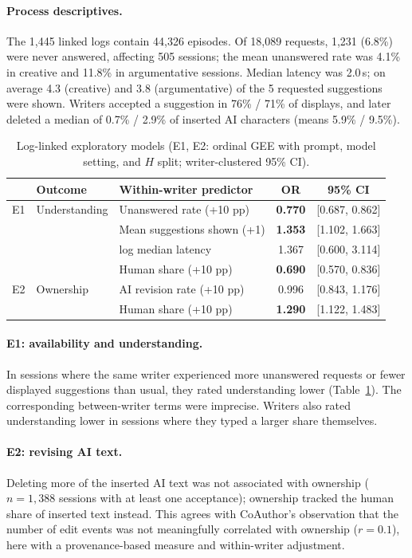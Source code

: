 \documentclass[10pt]{article}
\begin{document}
\paragraph{Process descriptives.} The 1,445 linked logs contain 44,326 episodes. Of 18,089 requests, 1,231 (6.8\%) were never answered, affecting 505 sessions; the mean unanswered rate was 4.1\% in creative and 11.8\% in argumentative sessions. Median latency was 2.0\,s; on average 4.3 (creative) and 3.8 (argumentative) of the 5 requested suggestions were shown. Writers accepted a suggestion in 76\% / 71\% of displays, and later deleted a median of 0.7\% / 2.9\% of inserted AI characters (means 5.9\% / 9.5\%).

\begin{table}[h]
\centering\small
\caption{Log-linked exploratory models (E1, E2: ordinal GEE with prompt, model setting, and $H$ split; writer-clustered 95\% CI).}\label{tab:logs}
\begin{tabular}{lllcc}
\toprule
& Outcome & Within-writer predictor & OR & 95\% CI \\
\midrule
E1 & Understanding & Unanswered rate (+10 pp) & \textbf{0.770} & [0.687, 0.862] \\
 & & Mean suggestions shown (+1) & \textbf{1.353} & [1.102, 1.663] \\
 & & log median latency & 1.367 & [0.600, 3.114] \\
 & & Human share (+10 pp) & \textbf{0.690} & [0.570, 0.836] \\
E2 & Ownership & AI revision rate (+10 pp) & 0.996 & [0.843, 1.176] \\
 & & Human share (+10 pp) & \textbf{1.290} & [1.122, 1.483] \\
\bottomrule
\end{tabular}
\end{table}

\paragraph{E1: availability and understanding.} In sessions where the same writer experienced more unanswered requests or fewer displayed suggestions than usual, they rated understanding lower (Table~\ref{tab:logs}). The corresponding between-writer terms were imprecise. Writers also rated understanding lower in sessions where they typed a larger share themselves.
\paragraph{E2: revising AI text.} Deleting more of the inserted AI text was not associated with ownership ($n=1{,}388$ sessions with at least one acceptance); ownership tracked the human share of inserted text instead. This agrees with CoAuthor's observation that the number of edit events was not meaningfully correlated with ownership ($r=0.1$), here with a provenance-based measure and within-writer adjustment.
\end{document}
